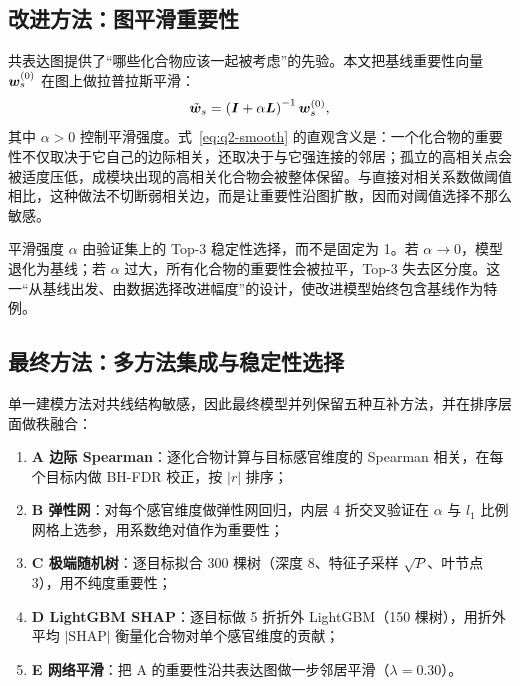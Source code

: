 \subsection{改进方法：图平滑重要性}

共表达图提供了“哪些化合物应该一起被考虑”的先验。本文把基线重要性向量 $\bm{w}_s^{(0)}$ 在图上做拉普拉斯平滑：
\begin{equation}
  \tilde{\bm{w}}_s=\left(\bm{I}+\alpha\bm{L}\right)^{-1}\bm{w}_s^{(0)},
  \label{eq:q2-smooth}
\end{equation}
其中 $\alpha>0$ 控制平滑强度。式~\eqref{eq:q2-smooth} 的直观含义是：一个化合物的重要性不仅取决于它自己的边际相关，还取决于与它强连接的邻居；孤立的高相关点会被适度压低，成模块出现的高相关化合物会被整体保留。与直接对相关系数做阈值相比，这种做法不切断弱相关边，而是让重要性沿图扩散，因而对阈值选择不那么敏感。

平滑强度 $\alpha$ 由验证集上的 Top-3 稳定性选择，而不是固定为 1。若 $\alpha\to 0$，模型退化为基线；若 $\alpha$ 过大，所有化合物的重要性会被拉平，Top-3 失去区分度。这一“从基线出发、由数据选择改进幅度”的设计，使改进模型始终包含基线作为特例。

\subsection{最终方法：多方法集成与稳定性选择}

单一建模方法对共线结构敏感，因此最终模型并列保留五种互补方法，并在排序层面做秩融合：

\begin{enumerate}
  \item \textbf{A 边际 Spearman}：逐化合物计算与目标感官维度的 Spearman 相关，在每个目标内做 BH-FDR 校正，按 $|r|$ 排序；
  \item \textbf{B 弹性网}：对每个感官维度做弹性网回归，内层 4 折交叉验证在 $\alpha$ 与 $l_1$ 比例网格上选参，用系数绝对值作为重要性\citep{zou2005regularization}；
  \item \textbf{C 极端随机树}：逐目标拟合 300 棵树（深度 8、特征子采样 $\sqrt{P}$、叶节点 3），用不纯度重要性\citep{breiman2001random}；
  \item \textbf{D LightGBM SHAP}：逐目标做 5 折折外 LightGBM（150 棵树），用折外平均 $|\mathrm{SHAP}|$ 衡量化合物对单个感官维度的贡献\citep{friedman2001greedy,chen2016xgboost,lundberg2017unified}；
  \item \textbf{E 网络平滑}：把 A 的重要性沿共表达图做一步邻居平滑（$\lambda=0.30$）。
\end{enumerate}

